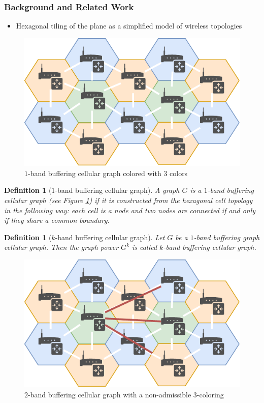 \documentclass{beamer} %
\newtheorem{defi}[lem]{Definition}
\begin{document}
\begin{frame}[allowframebreaks]
\frametitle{Background and Related Work}
\justifying
\begin{itemize}
\item Hexagonal tiling of the plane as a simplified model of wireless topologies
\end{itemize}
\begin{figure}
\centering
\includegraphics[scale=0.8]{figures/hexagonal-topology-wifi.pdf}
\caption{$1$-band buffering cellular graph colored with 3 colors}\label{fig:cellular-graph}
\end{figure}

\begin{defi}[$1$-band buffering cellular graph]  A graph $G$ is a $1$-band buffering \textit{cellular graph} (see Figure \ref{fig:cellular-graph}) if it is constructed from the hexagonal cell topology in the following way: each cell is a node and two nodes are connected if and only if they share a common boundary.
\end{defi}
\begin{defi}[$k$-band buffering cellular graph] Let $G$ be a $1$-band buffering graph cellular graph. Then the graph power $G^k$ is called $k$-band buffering cellular graph.
\end{defi}

\begin{figure}
\centering
\includegraphics[scale=1]{figures/hexagonal-topology-wifi-2.pdf}
\caption{$2$-band buffering cellular graph with a non-admissible 3-coloring}\label{fig:cellular-graph-2}
\end{figure}



\end{frame}
\end{document}
